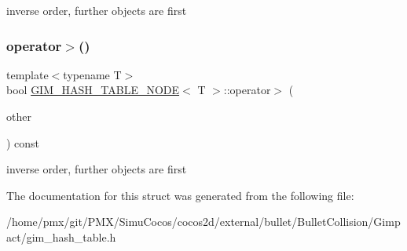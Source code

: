 inverse order, further objects are first \mbox{\label{structGIM__HASH__TABLE__NODE_acf7640e2bb9d45004154a4647eb4ef46}} 
\subsubsection{\texorpdfstring{operator$>$()}{operator>()}\hspace{0.1cm}{\footnotesize\ttfamily [2/2]}}
{\footnotesize\ttfamily template$<$typename T$>$ \\
bool \hyperlink{structGIM__HASH__TABLE__NODE}{G\+I\+M\+\_\+\+H\+A\+S\+H\+\_\+\+T\+A\+B\+L\+E\+\_\+\+N\+O\+DE}$<$ T $>$\+::operator$>$ (\begin{DoxyParamCaption}\item[{const \hyperlink{structGIM__HASH__TABLE__NODE}{G\+I\+M\+\_\+\+H\+A\+S\+H\+\_\+\+T\+A\+B\+L\+E\+\_\+\+N\+O\+DE}$<$ T $>$ \&}]{other }\end{DoxyParamCaption}) const\hspace{0.3cm}{\ttfamily [inline]}}

inverse order, further objects are first 

The documentation for this struct was generated from the following file\+:\begin{DoxyCompactItemize}
\item 
/home/pmx/git/\+P\+M\+X/\+Simu\+Cocos/cocos2d/external/bullet/\+Bullet\+Collision/\+Gimpact/gim\+\_\+hash\+\_\+table.\+h\end{DoxyCompactItemize}
